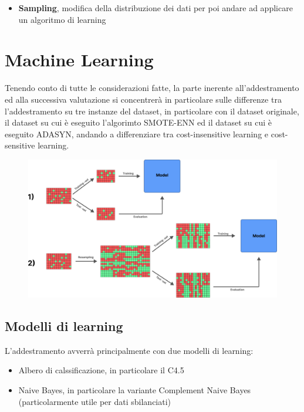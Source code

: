 \documentclass[italian,12pt,a4paper]{article}
\begin{document}
	\begin{itemize}
		\item \textbf{Sampling}, modifica della distribuzione dei dati per poi andare ad applicare un algoritmo di learning
	\end{itemize}
	
	\section{Machine Learning}
	Tenendo conto di tutte le considerazioni fatte, la parte inerente all'addestramento ed alla successiva valutazione si concentrerà in particolare sulle differenze tra l'addestramento su tre instanze del dataset, in particolare con il dataset originale, il dataset su cui è eseguito l'algorimto SMOTE-ENN ed il dataset su cui è eseguito ADASYN, andando a differenziare tra cost-insensitive learning e cost-sensitive learning.
	
	
		\begin{figure}[!h]
			\centering
			\includegraphics[width=15cm]{metodology_graph}
		\end{figure}
		
	\subsection{Modelli di learning}
	L'addestramento avverrà principalmente con due modelli di learning:
	
	\begin{itemize}
		\item Albero di calssificazione, in particolare il C4.5
		\item Naive Bayes, in particolare la variante Complement Naive Bayes (particolarmente utile per dati sbilanciati)
	\end{itemize}
	   
\end{document}
